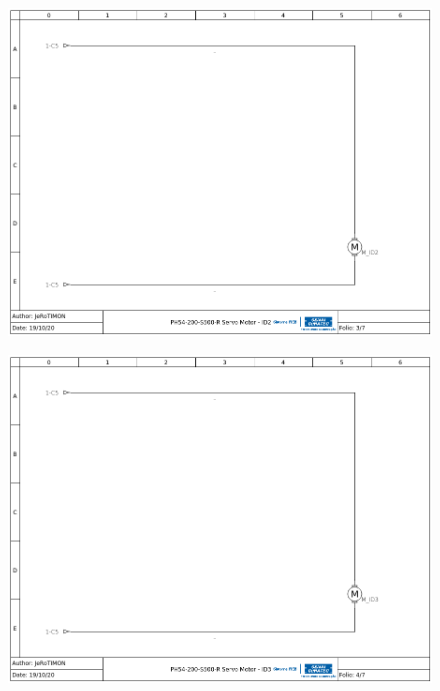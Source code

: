 \documentclass[
12pt,					%
openright,				%
twoside,				%
a4paper,				%
english,
brazil
]{ABNT/abntex2_report}
\begin{document}
	\begin{figure}[H]
		\centering
		\includegraphics[scale=0.72]{appendix/wiring_3.png}
		\label{fig:wiring3}
	\end{figure}

	\begin{figure}[H]
		\centering
		\includegraphics[scale=0.72]{appendix/wiring_4.png}
		\label{fig:wiring4}
	\end{figure}
\end{document}
